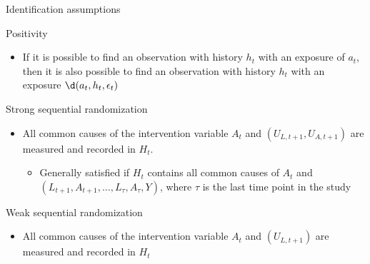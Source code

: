 \documentclass[
  10pt,
  ignorenonframetext,
]{beamer}
\providecommand{\tightlist}{%
  \setlength{\itemsep}{0pt}\setlength{\parskip}{0pt}}\usepackage{longtable,booktabs,array}
\begin{document}
\begin{frame}{Identification assumptions}
\protect\hypertarget{identification-assumptions}{}
\begin{block}{Positivity}
\protect\hypertarget{positivity}{}
\begin{itemize}
\tightlist
\item
  If it is possible to find an observation with history \(h_t\) with an
  exposure of \(a_t\), then it is also possible to find an observation
  with history \(h_t\) with an exposure \(\d(a_t, h_t, \epsilon_t)\)
\end{itemize}
\end{block}

\begin{block}{Strong sequential randomization}
\protect\hypertarget{strong-sequential-randomization}{}
\begin{itemize}
\item
  All common causes of the intervention variable \(A_t\) and
  \((U_{L,t+1}, U_{A,t+1})\) are measured and recorded in \(H_t\).

  \begin{itemize}
  \tightlist
  \item
    Generally satisfied if \(H_t\) contains all common causes of \(A_t\)
    and \((L_{t+1}, A_{t+1}, \ldots, L_\tau, A_\tau,\allowbreak Y)\),
    where \(\tau\) is the last time point in the study
  \end{itemize}
\end{itemize}
\end{block}

\begin{block}{Weak sequential randomization}
\protect\hypertarget{weak-sequential-randomization}{}
\begin{itemize}
\tightlist
\item
  All common causes of the intervention variable \(A_t\) and
  \((U_{L,t+1})\) are measured and recorded in \(H_t\)
\end{itemize}
\end{block}
\end{frame}
\end{document}
